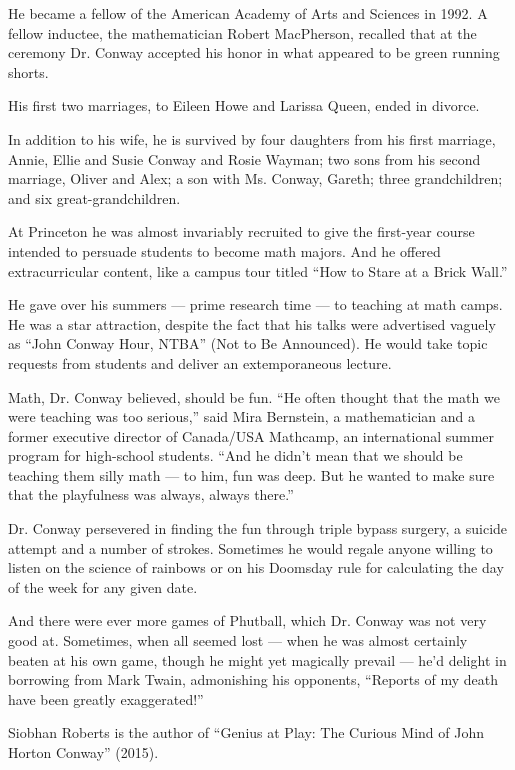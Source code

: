 He became a fellow of the American Academy of Arts and Sciences in 1992.
A fellow inductee, the mathematician Robert MacPherson, recalled that at
the ceremony Dr. Conway accepted his honor in what appeared to be green
running shorts.

His first two marriages, to Eileen Howe and Larissa Queen, ended in
divorce.

In addition to his wife, he is survived by four daughters from his first
marriage, Annie, Ellie and Susie Conway and Rosie Wayman; two sons from
his second marriage, Oliver and Alex; a son with Ms. Conway, Gareth;
three grandchildren; and six great-grandchildren.

At Princeton he was almost invariably recruited to give the first-year
course intended to persuade students to become math majors. And he
offered extracurricular content, like a campus tour titled ``How to
Stare at a Brick Wall.''

He gave over his summers --- prime research time --- to teaching at math
camps. He was a star attraction, despite the fact that his talks were
advertised vaguely as ``John Conway Hour, NTBA'' (Not to Be Announced).
He would take topic requests from students and deliver an extemporaneous
lecture.

Math, Dr. Conway believed, should be fun. ``He often thought that the
math we were teaching was too serious,'' said Mira Bernstein, a
mathematician and a former executive director of Canada/USA Mathcamp, an
international summer program for high-school students. ``And he didn't
mean that we should be teaching them silly math --- to him, fun was
deep. But he wanted to make sure that the playfulness was always, always
there.''

Dr. Conway persevered in finding the fun through triple bypass surgery,
a suicide attempt and a number of strokes. Sometimes he would regale
anyone willing to listen on the science of rainbows or on his Doomsday
rule for calculating the day of the week for any given date.

And there were ever more games of Phutball, which Dr. Conway was not
very good at. Sometimes, when all seemed lost --- when he was almost
certainly beaten at his own game, though he might yet magically prevail
--- he'd delight in borrowing from Mark Twain, admonishing his
opponents, ``Reports of my death have been greatly exaggerated!''

Siobhan Roberts is the author of ``Genius at Play: The Curious Mind of
John Horton Conway'' (2015).

